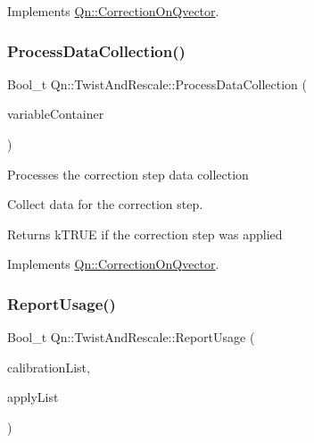 Implements \mbox{\hyperlink{classQn_1_1CorrectionOnQvector_a2c2d7f0e48471fb9269f0b5f9aa3e836}{Qn\+::\+Correction\+On\+Qvector}}.

\mbox{\label{classQn_1_1TwistAndRescale_ac0392e263ff658b876821ac06d5b2eff}} 
\subsubsection{\texorpdfstring{Process\+Data\+Collection()}{ProcessDataCollection()}}
{\footnotesize\ttfamily Bool\+\_\+t Qn\+::\+Twist\+And\+Rescale\+::\+Process\+Data\+Collection (\begin{DoxyParamCaption}\item[{const double $\ast$}]{variable\+Container }\end{DoxyParamCaption})\hspace{0.3cm}{\ttfamily [virtual]}}

Processes the correction step data collection

Collect data for the correction step. \begin{DoxyReturn}{Returns}
k\+T\+R\+UE if the correction step was applied 
\end{DoxyReturn}


Implements \mbox{\hyperlink{classQn_1_1CorrectionOnQvector_a2c0a668d885b5a42503869303c859a0b}{Qn\+::\+Correction\+On\+Qvector}}.

\mbox{\label{classQn_1_1TwistAndRescale_a2a6c985100656523b3d834a31d8f19a8}} 
\subsubsection{\texorpdfstring{Report\+Usage()}{ReportUsage()}}
{\footnotesize\ttfamily Bool\+\_\+t Qn\+::\+Twist\+And\+Rescale\+::\+Report\+Usage (\begin{DoxyParamCaption}\item[{T\+List $\ast$}]{calibration\+List,  }\item[{T\+List $\ast$}]{apply\+List }\end{DoxyParamCaption})\hspace{0.3cm}{\ttfamily [virtual]}}

